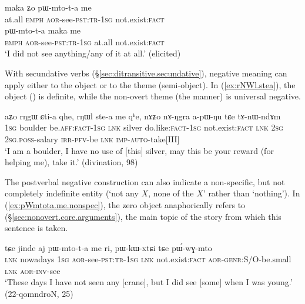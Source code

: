 \begin{exe}
\ex 
\begin{xlist}
\ex \label{ex:maka.V.me}
\gll maka ʑo pɯ-mto-t-a me \\
at.all \textsc{emph} \textsc{aor}-see-\textsc{pst}:\textsc{tr}-\textsc{1sg} not.exist:\textsc{fact} \\
\ex \label{ex:V.maka.me}
\gll pɯ-mto-t-a maka me \\
\textsc{emph} \textsc{aor}-see-\textsc{pst}:\textsc{tr}-\textsc{1sg} at.all  not.exist:\textsc{fact} \\
\glt `I did not see anything/any of it at all.' (elicited)
\end{xlist}
\end{exe}

With secundative verbs (§\ref{sec:ditransitive.secundative}), negative meaning can apply either to the object or to the theme (semi-object). In (\ref{ex:rNWl.stea}), the object () is definite, while the non-overt theme (the manner) is universal negative.


\begin{exe}
\ex \label{ex:rNWl.stea}
\gll aʑo rŋgɯ ɕti-a qhe, rŋɯl ste-a me qʰe, nɤʑo nɤ-ŋgra a-pɯ-ŋu tɕe tɤ-nɯ-ndɤm \\
\textsc{1sg} boulder be.\textsc{aff}:\textsc{fact}-\textsc{1sg} \textsc{lnk} silver do.like:\textsc{fact}-\textsc{1sg} not.exist:\textsc{fact} \textsc{lnk} \textsc{2sg} \textsc{2sg}.\textsc{poss}-salary \textsc{irr}-\textsc{pfv}-be \textsc{lnk} \textsc{imp}-\textsc{auto}-take[III] \\
\glt `I am a boulder, I have no use of [this] silver, may this be your reward (for helping me), take it.' (divination, 98)
\end{exe}

The postverbal negative construction can also indicate a non-specific, but not completely indefinite entity (`not any $X$, none of the $X$' rather than `nothing'). In (\ref{ex:pWmtota.me.nonspec}), the zero object anaphorically refers to  (§\ref{sec:nonovert.core.arguments}), the main topic of the story from which this sentence is taken.

\begin{exe}
\ex \label{ex:pWmtota.me.nonspec}
\gll tɕe jinde aj pɯ-mto-t-a me ri, pɯ-kɯ-xtɕi tɕe pɯ́-wɣ-mto \\
\textsc{lnk} nowadays \textsc{1sg} \textsc{aor}-see-\textsc{pst}:\textsc{tr}-\textsc{1sg} \textsc{lnk} not.exist:\textsc{fact} \textsc{aor}-\textsc{genr}:S/O-be.small \textsc{lnk} \textsc{aor}-\textsc{inv}-see \\
\glt `These days I have not seen any [crane], but I did see [some] when I was young.' (22-qomndroN, 25)
\end{exe}

